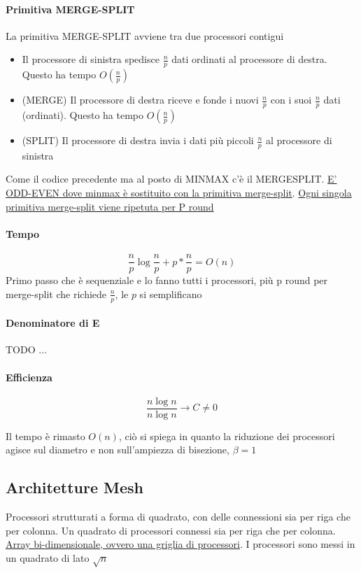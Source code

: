 \paragraph{Primitiva MERGE-SPLIT}
La primitiva MERGE-SPLIT avviene tra due processori contigui
\begin{itemize}
    \item Il processore di sinistra spedisce $\frac{n}{p}$ dati ordinati al processore di destra. Questo ha tempo $O(\frac{n}{p})$
    \item (MERGE) Il processore di destra riceve e fonde i nuovi $\frac{n}{p}$ con i suoi $\frac{n}{p}$ dati (ordinati). Questo ha tempo $O(\frac{n}{p})$
    \item (SPLIT) Il processore di destra invia i dati più piccoli $\frac{n}{p}$ al processore di sinistra
\end{itemize}

Come il codice precedente ma al posto di MINMAX c'è il MERGESPLIT. \uline{E' ODD-EVEN dove minmax è sostituito con la primitiva merge-split}. \uline{Ogni singola primitiva merge-split viene ripetuta per P round}

\paragraph{Tempo}
$$\frac{n}{p} \log \frac{n}{p} + p * \frac{n}{p} = O(n)$$
Primo passo che è sequenziale e lo fanno tutti i processori, più p round per merge-split che richiede $\frac{n}{p}$, le $p$ si semplificano

\paragraph{Denominatore di E}
TODO $\dots$

\paragraph{Efficienza}
$$\frac{n \log n}{n \log n} \rightarrow C \neq 0$$

\begin{osservazione}
    Il tempo è rimasto $O(n)$, ciò si spiega in quanto la riduzione dei processori agisce sul diametro e non sull'ampiezza di bisezione, $\beta = 1$
\end{osservazione}


\subsection{Architetture Mesh}
Processori strutturati a forma di quadrato, con delle connessioni sia per riga che per colonna. Un quadrato di processori connessi sia per riga che per colonna. \uline{Array bi-dimensionale, ovvero una griglia di processori}. I processori sono messi in un quadrato di lato $\sqrt{n}$

